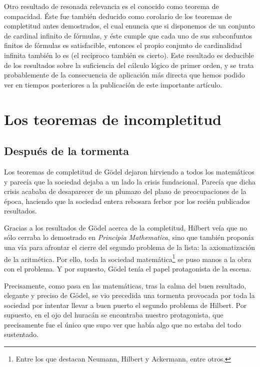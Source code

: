 Otro resultado de resonada relevancia es el conocido como teorema de compacidad. Éste fue también deducido como corolario de los teoremas de completitud antes demostrados, el cual enuncia que si disponemos de un 
conjunto de cardinal infinito de fórmulas, y éste cumple que cada uno de sus subconfuntos finitos de fórmulas es satisfacible, entonces el propio conjunto de cardinalidad infinita también lo es (el recíproco también es cierto).
Este resultado es deducible de los resultados sobre la suficiencia del cálculo lógico de primer orden, y se trata probablemente de la consecuencia de aplicación más directa que hemos podido ver en tiempos posteriores a la 
publicación de este importante artículo.


\chapter{Los teoremas de incompletitud}

\section{Después de la tormenta}

Los teoremas de completitud de Gödel dejaron hirviendo a todos los matemáticos y parecía que la sociedad dejaba a un lado la crisis fundacional. Parecía que dicha crisis acababa de desaparecer de un plumazo del plano de preocupaciones
de la época, haciendo que la sociedad entera rebosara ferbor por los recién publicados resultados. 

Gracias a los resultados de Gödel acerca de la completitud, Hilbert veía que no sólo cerraba lo demostrado en \textit{Principia Mathematica}, sino que también proponía una vía para afrontar el cierre del segundo problema 
de la lista: la axiomatización de la aritmética. Por ello, toda la sociedad matemática\footnote{Entre los que destacan Neumann, Hilbert y Ackermann, entre otros.} se puso manos a la obra con el problema. Y por supuesto,
Gödel tenía el papel protagonista de la escena.

Precisamente, como pasa en las matemáticas, tras la calma del buen resultado, elegante y preciso de Gödel, se vio precedida una tormenta provocada por toda la sociedad por intentar llevar a buen puerto el segundo problema de 
Hilbert. Por supuesto, en el ojo del huracán se encontraba nuestro protagonista, que precisamente fue el único que supo ver que había algo que no estaba del todo sustentado.

